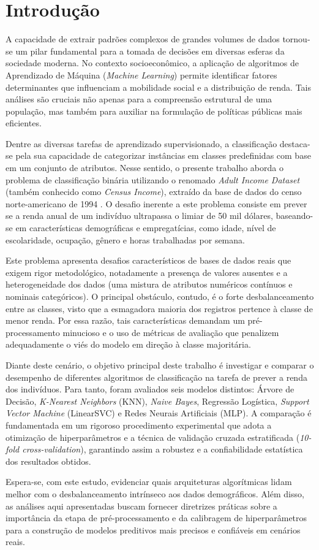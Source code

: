 \section{Introdução}

A capacidade de extrair padrões complexos de grandes volumes de dados tornou-se um pilar fundamental para a tomada de decisões em diversas esferas da sociedade moderna. No contexto socioeconômico, a aplicação de algoritmos de Aprendizado de Máquina (\textit{Machine Learning}) permite identificar fatores determinantes que influenciam a mobilidade social e a distribuição de renda. Tais análises são cruciais não apenas para a compreensão estrutural de uma população, mas também para auxiliar na formulação de políticas públicas mais eficientes.

Dentre as diversas tarefas de aprendizado supervisionado, a classificação destaca-se pela sua capacidade de categorizar instâncias em classes predefinidas com base em um conjunto de atributos. Nesse sentido, o presente trabalho aborda o problema de classificação binária utilizando o renomado \textit{Adult Income Dataset} (também conhecido como \textit{Census Income}), extraído da base de dados do censo norte-americano de 1994 \cite{becker1996adult}. O desafio inerente a este problema consiste em prever se a renda anual de um indivíduo ultrapassa o limiar de 50 mil dólares, baseando-se em características demográficas e empregatícias, como idade, nível de escolaridade, ocupação, gênero e horas trabalhadas por semana.

Este problema apresenta desafios característicos de bases de dados reais que exigem rigor metodológico, notadamente a presença de valores ausentes e a heterogeneidade dos dados (uma mistura de atributos numéricos contínuos e nominais categóricos). O principal obstáculo, contudo, é o forte desbalanceamento entre as classes, visto que a esmagadora maioria dos registros pertence à classe de menor renda. Por essa razão, tais características demandam um pré-processamento minucioso e o uso de métricas de avaliação que penalizem adequadamente o viés do modelo em direção à classe majoritária.

Diante deste cenário, o objetivo principal deste trabalho é investigar e comparar o desempenho de diferentes algoritmos de classificação na tarefa de prever a renda dos indivíduos. Para tanto, foram avaliados seis modelos distintos: Árvore de Decisão, \textit{K-Nearest Neighbors} (KNN), \textit{Naive Bayes}, Regressão Logística, \textit{Support Vector Machine} (LinearSVC) e Redes Neurais Artificiais (MLP). A comparação é fundamentada em um rigoroso procedimento experimental que adota a otimização de hiperparâmetros e a técnica de validação cruzada estratificada (\textit{10-fold cross-validation}), garantindo assim a robustez e a confiabilidade estatística dos resultados obtidos.

Espera-se, com este estudo, evidenciar quais arquiteturas algorítmicas lidam melhor com o desbalanceamento intrínseco aos dados demográficos. Além disso, as análises aqui apresentadas buscam fornecer diretrizes práticas sobre a importância da etapa de pré-processamento e da calibragem de hiperparâmetros para a construção de modelos preditivos mais precisos e confiáveis em cenários reais.